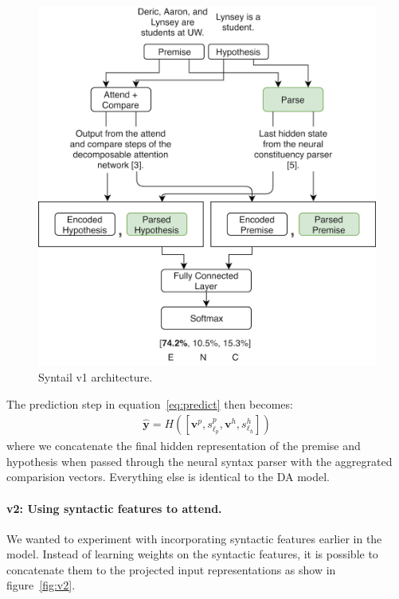 \documentclass[11pt,a4paper]{article}
\begin{document}
\begin{figure}[htb]
    \centering
    \includegraphics[width=\linewidth]{figures/v1.png}
    \caption{Syntail v1 architecture.}
\label{fig:v1}
\end{figure}

The prediction step in equation~\ref{eq:predict} then becomes:
\begin{align}
    \hat{\bm{y}} = H([\bm{v}^p, s^p_{\ell_p}, \bm{v}^h, s^h_{\ell_h}])
\end{align}
where we concatenate the final hidden representation of the premise and
hypothesis when passed through the neural syntax parser with the aggregrated
comparision vectors.  Everything else is identical to the DA model.

\paragraph{v2: Using syntactic features to attend.} We wanted to experiment
with incorporating syntactic features earlier in the model.  Instead of
learning weights on the syntactic features, it is possible to concatenate them
to the projected input representations as show in figure~\ref{fig:v2}.
\end{document}
